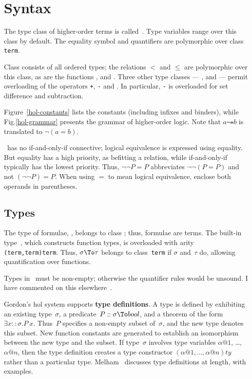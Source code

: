 \section{Syntax}
The type class of higher-order terms is called~.  Type variables
range over this class by default.  The equality symbol and quantifiers are
polymorphic over class {\tt term}.

Class  consists of all ordered types; the relations $<$ and
$\leq$ are polymorphic over this class, as are the functions
,  and .  Three other
type classes --- ,  and  --- permit
overloading of the operators {\tt+}, {\tt-} and {\tt*}.  In particular,
{\tt-} is overloaded for set difference and subtraction.

Figure~\ref{hol-constants} lists the constants (including infixes and
binders), while Fig.\ts\ref{hol-grammar} presents the grammar of
higher-order logic.  Note that $a$\verb|~=|$b$ is translated to
$\neg(a=b)$.

\begin{warn}
  \HOL\ has no if-and-only-if connective; logical equivalence is expressed
  using equality.  But equality has a high priority, as befitting a
  relation, while if-and-only-if typically has the lowest priority.  Thus,
  $\neg\neg P=P$ abbreviates $\neg\neg (P=P)$ and not $(\neg\neg P)=P$.
  When using $=$ to mean logical equivalence, enclose both operands in
  parentheses.
\end{warn}

\subsection{Types}\label{hol-types}
The type of formulae, , belongs to class ; thus,
formulae are terms.  The built-in type~, which constructs function
types, is overloaded with arity {\tt(term,term)term}.  Thus, $\sigma\To\tau$
belongs to class~{\tt term} if $\sigma$ and~$\tau$ do, allowing quantification
over functions.

Types in \HOL\ must be non-empty; otherwise the quantifier rules would be
unsound.  I have commented on this elsewhere~\cite[\S7]{paulson-COLOG}.

Gordon's {\sc hol} system supports {\bf type definitions}.  A type is
defined by exhibiting an existing type~$\sigma$, a predicate~$P::\sigma\To
bool$, and a theorem of the form $\exists x::\sigma.P~x$.  Thus~$P$
specifies a non-empty subset of~$\sigma$, and the new type denotes this
subset.  New function constants are generated to establish an isomorphism
between the new type and the subset.  If type~$\sigma$ involves type
variables $\alpha@1$, \ldots, $\alpha@n$, then the type definition creates
a type constructor $(\alpha@1,\ldots,\alpha@n)ty$ rather than a particular
type.  Melham~\cite{melham89} discusses type definitions at length, with
examples. 

